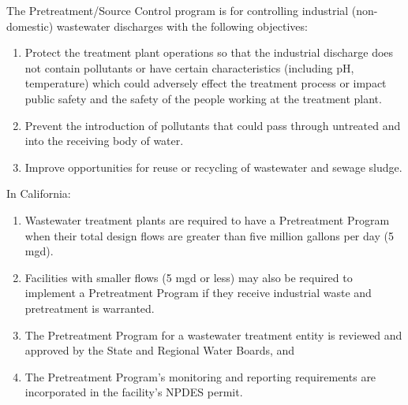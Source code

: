 The Pretreatment/Source Control program is for controlling industrial (non-domestic) wastewater discharges with the following objectives:
\begin{enumerate}
\item Protect the treatment plant operations so that the industrial discharge does not contain pollutants or have certain characteristics (including pH, temperature) which could adversely effect the treatment process or impact public safety and the safety of the people working at the treatment plant.
\item Prevent the introduction of pollutants that could pass through untreated and into the receiving body of water.

\item Improve opportunities for reuse or recycling of wastewater and sewage sludge.

\end{enumerate}

In California:
\begin{enumerate}
\item Wastewater treatment plants are required to have a Pretreatment Program when their total design flows are greater than five million gallons per day (5 mgd). 
\item Facilities with smaller flows (5 mgd or less) may also be required to implement a Pretreatment Program if they receive industrial waste and pretreatment is warranted.
\item The Pretreatment Program for a wastewater treatment entity is reviewed and approved by the State and Regional Water Boards, and 
\item The Pretreatment Program's monitoring and reporting requirements are incorporated in the facility's NPDES permit.
\end{enumerate}

